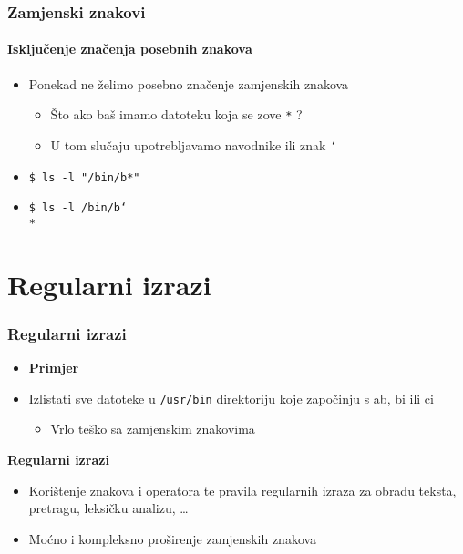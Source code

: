 \documentclass[table,usenames,dvipsnames]{beamer}
\newcommand{\shell}[1]{\texttt{#1}}
\begin{document}
\begin{frame}[t]
\frametitle{Zamjenski znakovi}
\framesubtitle{Isključenje značenja posebnih znakova}
\begin{itemize}
  \item Ponekad ne želimo posebno značenje zamjenskih znakova
  \begin{itemize}
    \item Što ako baš imamo datoteku koja se zove \shell{*} ?
    \item U tom slučaju upotrebljavamo navodnike ili znak 
          \shell{\char`\\}
  \end{itemize}
\end{itemize}
\small
  \begin{itemize}
    \item[] \shell{\$ ls -l "/bin/b*"}
    \item[] \shell{\$ ls -l /bin/b\char`\\{}*}
  \end{itemize}
\end{frame}

\section{Regularni izrazi}
\begin{frame}[t]
\frametitle{Regularni izrazi}
\begin{itemize}
  \item \textbf{Primjer}
  \item[] Izlistati sve datoteke u \shell{/usr/bin} direktoriju koje započinju s ab, bi ili ci
  \begin{itemize}
	  \item Vrlo teško sa zamjenskim znakovima
  \end{itemize}
\end{itemize}
\vfill
\textbf{Regularni izrazi}
  \begin{itemize}
    \item Korištenje znakova i operatora te pravila regularnih izraza za 
          obradu teksta, pretragu, leksičku analizu, \ldots
    \item Moćno i kompleksno proširenje zamjenskih znakova
  \end{itemize}
\vfill
\end{frame}
\end{document}

